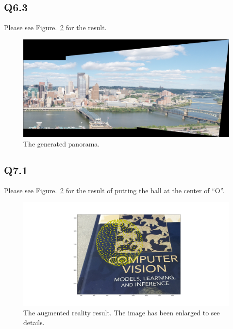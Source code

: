 \documentclass[11pt]{article}
\begin{document}
\newpage

\subsection*{Q6.3}

Please see Figure.~\ref{fig:q6.3} for the result.

\begin{figure}[h!]
    \centering
    \includegraphics[width=.8\linewidth]{../results/q6_3.jpg}
    \caption{The generated panorama. }
    \label{fig:q6.3}
\end{figure}

\newpage

\subsection*{Q7.1}

Please see Figure.~\ref{fig:q6.3} for the result of putting the ball at the center of ``O''.

\begin{figure}[h!]
    \centering
    \includegraphics[width=\linewidth]{../results/q7_2.png}
    \caption{The augmented reality result. The image has been enlarged to see details.  }
    \label{fig:q6.3}
\end{figure}
\end{document}
